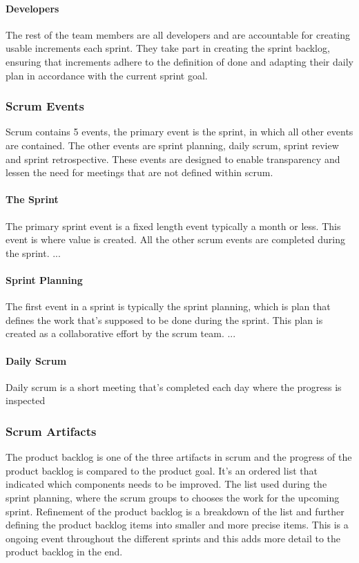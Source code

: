 \paragraph{Developers}
The rest of the team members are all developers and are accountable for creating usable increments each sprint.
They take part in creating the sprint backlog, ensuring that increments adhere to the definition of done and adapting their daily plan in accordance with the current sprint goal. \cite{schwaber_sutherland_2022}

\subsubsection{Scrum Events}
Scrum contains 5 events, the primary event is the sprint, in which all other events are contained. The other events are sprint planning, daily scrum, sprint review and sprint retrospective.
These events are designed to enable transparency and lessen the need for meetings that are not defined within scrum. \cite{schwaber_sutherland_2022}

\paragraph{The Sprint}
The primary sprint event is a fixed length event typically a month or less. This event is where value is created.
All the other scrum events are completed during the sprint.
...\cite{schwaber_sutherland_2022}

\paragraph{Sprint Planning}
The first event in a sprint is typically the sprint planning, which is plan that defines the work that's supposed to be done during the sprint.
This plan is created as a collaborative effort by the scrum team.
...

\paragraph{Daily Scrum}
Daily scrum is a short meeting that's completed each day where the progress is inspected 


\subsubsection{Scrum Artifacts}
The product backlog is one of the three artifacts in scrum and the progress of the product backlog is compared to the product goal.
It's an ordered list that indicated which components needs to be improved.
The list used during the sprint planning, where the scrum groups to chooses the work for the upcoming sprint.
Refinement of the product backlog is a breakdown of the list and further defining the product backlog items into smaller and more precise items.
This is a ongoing event throughout the different sprints and this adds more detail to the product backlog in the end. \cite{schwaber_sutherland_2022}

